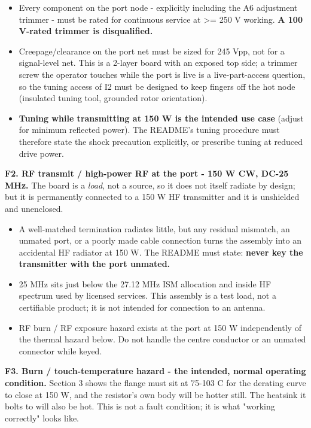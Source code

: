 \documentclass[11pt,a4paper]{article}
\begin{document}
\begin{itemize}
\item Every component on the port node - explicitly including the A6 adjustment trimmer - must be
rated for continuous service at \textgreater{}= 250 V working. \textbf{A 100 V-rated trimmer is disqualified.}
\item Creepage/clearance on the port net must be sized for 245 Vpp, not for a signal-level net.
This is a 2-layer board with an exposed top side; a trimmer screw the operator touches while
the port is live is a live-part-access question, so the tuning access of I2 must be designed to
keep fingers off the hot node (insulated tuning tool, grounded rotor orientation).
\item \textbf{Tuning while transmitting at 150 W is the intended use case} (adjust for minimum reflected
power). The README's tuning procedure must therefore state the shock precaution explicitly, or
prescribe tuning at reduced drive power.
\end{itemize}
\textbf{F2. RF transmit / high-power RF at the port - 150 W CW, DC-25 MHz.} The board is a \emph{load}, not a source, so it does not itself radiate by design; but it is permanently connected to a 150 W HF transmitter and it is unshielded and unenclosed.

\begin{itemize}
\item A well-matched termination radiates little, but any residual mismatch, an unmated port, or a
poorly made cable connection turns the assembly into an accidental HF radiator at 150 W. The
README must state: \textbf{never key the transmitter with the port unmated.}
\item 25 MHz sits just below the 27.12 MHz ISM allocation and inside HF spectrum used by licensed
services. This assembly is a test load, not a certifiable product; it is not intended for
connection to an antenna.
\item RF burn / RF exposure hazard exists at the port at 150 W independently of the thermal hazard
below. Do not handle the centre conductor or an unmated connector while keyed.
\end{itemize}
\textbf{F3. Burn / touch-temperature hazard - the intended, normal operating condition.} Section 3 shows the flange must sit at 75-103 C for the derating curve to close at 150 W, and the resistor's own body will be hotter still. The heatsink it bolts to will also be hot. This is not a fault condition; it is what "working correctly" looks like.
\end{document}
